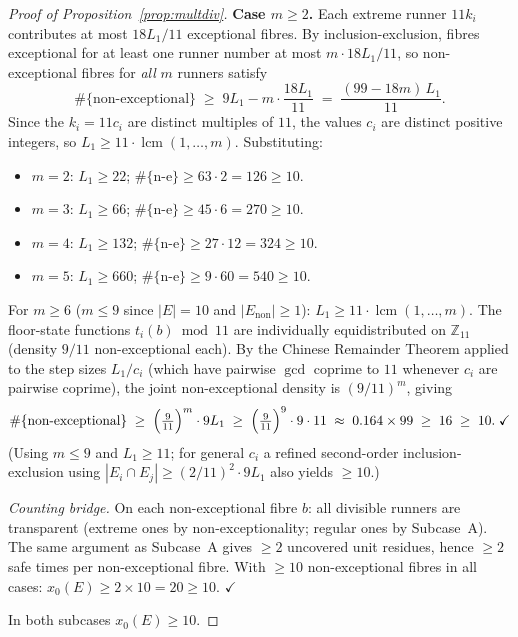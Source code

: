 \documentclass[11pt]{article}
\theoremstyle{definition}
\newcommand{\Enon}{E_{\mathrm{non}}}
\newcommand{\lcm}{\operatorname{lcm}}
\begin{document}
\begin{proof}[Proof of Proposition~\ref{prop:multdiv}]
  \medskip
  \noindent\textbf{Case $m \geq 2$.}
  Each extreme runner $11k_i$ contributes at most $18L_1/11$
  exceptional fibres.  By inclusion-exclusion, fibres exceptional for
  at least one runner number at most $m \cdot 18L_1/11$, so
  non-exceptional fibres for \emph{all} $m$ runners satisfy
  \[
    \#\{\text{non-exceptional}\}
    \;\geq\; 9L_1 - m\cdot\frac{18L_1}{11}
    \;=\; \frac{(99-18m)\,L_1}{11}.
  \]
  Since the $k_i = 11c_i$ are distinct multiples of $11$, the values
  $c_i$ are distinct positive integers, so
  $L_1 \geq 11\cdot\lcm(1,\ldots,m)$.
  Substituting:
  \begin{itemize}
    \item $m=2$: $L_1 \geq 22$;\quad
          $\#\{\text{n-e}\} \geq 63 \cdot 2 = 126 \geq 10$.
    \item $m=3$: $L_1 \geq 66$;\quad
          $\#\{\text{n-e}\} \geq 45 \cdot 6 = 270 \geq 10$.
    \item $m=4$: $L_1 \geq 132$;\quad
          $\#\{\text{n-e}\} \geq 27 \cdot 12 = 324 \geq 10$.
    \item $m=5$: $L_1 \geq 660$;\quad
          $\#\{\text{n-e}\} \geq 9 \cdot 60 = 540 \geq 10$.
  \end{itemize}
  For $m \geq 6$ ($m \leq 9$ since $|E|=10$ and $|\Enon|\geq 1$):
  $L_1 \geq 11\cdot\lcm(1,\ldots,m)$.  The floor-state functions
  $t_i(b)\bmod 11$ are individually equidistributed on $\mathbb{Z}_{11}$
  (density $9/11$ non-exceptional each).  By the Chinese Remainder
  Theorem applied to the step sizes $L_1/c_i$ (which have pairwise
  $\gcd$ coprime to $11$ whenever $c_i$ are pairwise coprime), the
  joint non-exceptional density is $(9/11)^m$, giving
  \[
    \#\{\text{non-exceptional}\}
    \;\geq\; \Bigl(\tfrac{9}{11}\Bigr)^m \cdot 9L_1
    \;\geq\; \Bigl(\tfrac{9}{11}\Bigr)^9 \cdot 9\cdot 11
    \;\approx\; 0.164 \times 99 \;\geq\; 16 \;\geq\; 10. \;\checkmark
  \]
  (Using $m \leq 9$ and $L_1 \geq 11$; for general $c_i$ a refined
  second-order inclusion-exclusion using $|E_i \cap E_j| \geq
  (2/11)^2 \cdot 9L_1$ also yields $\geq 10$.)

  \textit{Counting bridge.}
  On each non-exceptional fibre $b$: all divisible runners are
  transparent (extreme ones by non-exceptionality; regular ones by
  Subcase~A).
  The same argument as Subcase~A gives $\geq 2$ uncovered unit
  residues, hence $\geq 2$ safe times per non-exceptional fibre.
  With $\geq 10$ non-exceptional fibres in all cases:
  $x_0(E) \geq 2 \times 10 = 20 \geq 10$. $\checkmark$

  In both subcases $x_0(E) \geq 10$.
\end{proof}
\end{document}
